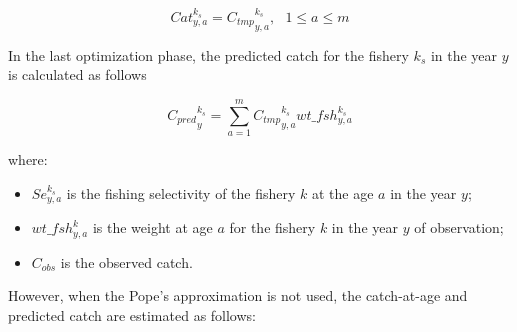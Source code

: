 \documentclass{article}
\begin{document}
\begin{equation}
Cat^{k_s}_{y,a}={C_{tmp}}^{k_s}_{y,a},  \  \  \ 1\leq a \leq m
\end{equation}

In the last optimization phase, the predicted catch for the fishery $k_s$ in the year $y$ is calculated as follows 

\begin{equation}
{C_{pred}}^{k_s}_y=\sum_{a=1}^{m}{C_{tmp}}^{k_s}_{y,a} wt\_fsh^{k_s}_{y,a}
\end{equation} 

where:        
\begin{itemize}

    \item $Se_{y,a}^{k_s}$ is the fishing selectivity of the fishery $k$ at the age $a$ in the year $y$;
    
    \item $wt\_fsh^{k}_{y,a}$ is the weight at age $a$ for the fishery $k$ in the year $y$ of observation;
    
    \item $C_{obs}$ is the observed catch.
    
    

 
\end{itemize}

However, when the Pope's approximation is not used, the catch-at-age and predicted catch are estimated as follows:
\end{document}
